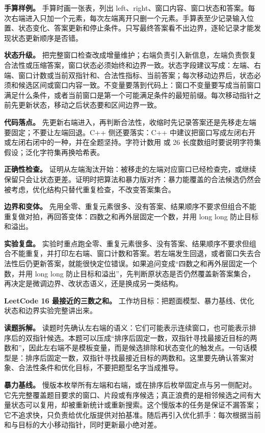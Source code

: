 \textbf{手算样例。} 手算时画一张表，列出 left、right、窗口内容、窗口状态和答案。每次右端进入只加一个元素，每次左端离开只删一个元素。手算表至少记录输入位置、状态变化、答案更新和停止条件。只写最终答案看不出边界，逐轮记录才能发现状态更新顺序是否错。

\textbf{状态升级。} 把完整窗口检查改成增量维护；右端负责引入新信息，左端负责恢复合法性或压缩答案，窗口状态必须始终和边界一致。状态字段建议写成：左端、右端、窗口计数或当前双指针和、合法性指标、当前答案；每次移动边界后，状态必须和候选区间或窗口内容一致。不变量要落到代码上：窗口不变量要写成当前窗口满足什么条件，或者当前窗口是第一个可能满足条件的最短前缀。每次移动指针之前先更新状态，移动之后状态要和区间边界一致。

\textbf{代码落点。} 先更新右端进入，再判断合法性，收缩时先记录答案还是先移走左端要固定；不要让左端回退。C++ 侧还要落实：C++ 中建议把窗口写成左闭右开或左闭右闭中的一种，并在全题坚持。字符计数用  或 26 长度数组时要说明字符集假设；泛化字符集再换哈希表。

\textbf{正确性检查。} 证明从左端淘汰开始：被移走的左端对应窗口已经检查完，或继续保留只会让状态更差。证明时把算法和暴力版对齐：暴力能覆盖的合法候选仍然会被考虑，优化结构只替代重复检查，不改变答案集合。

\textbf{边界和变体。} 先用全零、重复元素很多、没有答案、结果顺序不要求但组合不能重复做对拍，再回答变体：四数之和再外层固定一个数，并用 long long 防止目标和溢出。

\textbf{实验复盘。} 实验时重点跑全零、重复元素很多、没有答案、结果顺序不要求但组合不能重复，并打印左右端、窗口计数和答案。若左端发生回退，或者窗口失去合法性后仍更新答案，就能很快定位错误。如果追问变成“四数之和再外层固定一个数，并用 long long 防止目标和溢出”，先判断原状态是否仍然覆盖新答案集合，再决定是微调边界、改状态语义，还是换成另一类结构。

\noindent\textbf{LeetCode 16 最接近的三数之和。} 工作坊目标：把题面模型、暴力基线、优化状态和边界实验完整讲出来。

\textbf{读题拆解。} 读题时先确认左右端的语义：它们可能表示连续窗口，也可能表示排序后的双指针候选。本题可以压成“排序后固定一数，双指针寻找最接近目标的两数和”，因此左右端不是模板变量，而是候选排除和状态变化的触发点。一句话模型是：排序后固定一数，双指针寻找最接近目标的两数和。这里要先确认答案对象、合法性条件和优化目标，不要把题型名字当成推导。

\textbf{暴力基线。} 慢版本枚举所有左端和右端，或在排序后枚举固定点与另一侧配对。它先完整覆盖题目要求的窗口、片段或有序候选；真正浪费的是相邻候选之间有大量状态可以复用，却被重新统计或重新搜索。这个慢版本的任务是保证不漏答案；它不追求快，只负责给优化版提供对拍基准。随后再引入优化抓手：每次根据当前和与目标的大小移动指针，同时更新最小绝对差。

